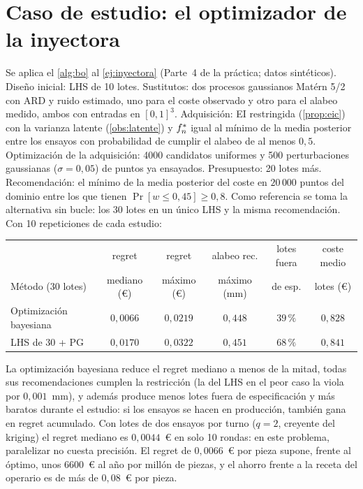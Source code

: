 \section{Caso de estudio: el optimizador de la inyectora}

\begin{ejemplo}\label{ej:bo-inyectora}
Se aplica el \cref{alg:bo} al \cref{ej:inyectora} (Parte~4 de la práctica; datos sintéticos). Diseño inicial: LHS de 10 lotes. Sustitutos: dos procesos gaussianos Matérn 5/2 con ARD y ruido estimado, uno para el coste observado y otro para el alabeo medido, ambos con entradas en $[0,1]^3$. Adquisición: EI restringida (\cref{prop:eic}) con la varianza latente (\cref{obs:latente}) y $f^{*}_{n}$ igual al mínimo de la media posterior entre los ensayos con probabilidad de cumplir el alabeo de al menos $0{,}5$. Optimización de la adquisición: 4000 candidatos uniformes y 500 perturbaciones gaussianas ($\sigma=0{,}05$) de puntos ya ensayados. Presupuesto: 20 lotes más. Recomendación: el mínimo de la media posterior del coste en $20\,000$ puntos del dominio entre los que tienen $\Pr[w\le0{,}45]\ge0{,}8$. Como referencia se toma la alternativa sin bucle: los 30 lotes en un único LHS y la misma recomendación. Con 10 repeticiones de cada estudio:
\begin{center}\small
\begin{tabular}{@{}lccccc@{}}
\toprule
 & regret & regret & alabeo rec. & lotes fuera & coste medio \\
Método (30 lotes) & mediano (€) & máximo (€) & máximo (mm) & de esp. & lotes (€) \\
\midrule
Optimización bayesiana & $0{,}0066$ & $0{,}0219$ & $0{,}448$ & $39\,\%$ & $0{,}828$ \\
LHS de 30 + PG & $0{,}0170$ & $0{,}0322$ & $0{,}451$ & $68\,\%$ & $0{,}841$ \\
\bottomrule
\end{tabular}
\end{center}
La optimización bayesiana reduce el regret mediano a menos de la mitad, todas sus recomendaciones cumplen la restricción (la del LHS en el peor caso la viola por $0{,}001$~mm), y además produce menos lotes fuera de especificación y más baratos durante el estudio: si los ensayos se hacen en producción, también gana en regret acumulado. Con lotes de dos ensayos por turno ($q=2$, creyente del kriging) el regret mediano es $0{,}0044$~€ en solo 10 rondas: en este problema, paralelizar no cuesta precisión. El regret de $0{,}0066$~€ por pieza supone, frente al óptimo, unos 6600~€ al año por millón de piezas, y el ahorro frente a la receta del operario es de más de $0{,}08$~€ por pieza.
\end{ejemplo}

